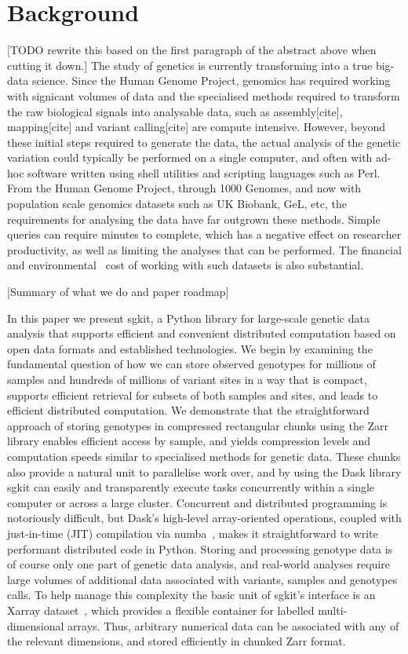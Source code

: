 \documentclass[a4paper,num-refs]{oup-contemporary}
\begin{document}
\section{Background}
[TODO rewrite this based on the first paragraph of the abstract above 
when cutting it down.]
The study of genetics is currently transforming into a true big-data science.
Since the Human Genome Project, genomics has required working with
signicant volumes of data and the specialised methods
required to transform the raw biological signals into analysable data,
such as assembly[cite], mapping[cite] and variant calling[cite] are compute intensive.
However, beyond these initial steps required to generate the data, the actual
analysis of the genetic variation could typically be performed on a single
computer, and often with ad-hoc software written using shell utilities
and scripting languages such as Perl.
From the Human Genome Project, through 1000 Genomes, and now with
population scale genomics datasets such as UK Biobank, GeL, etc,
the requirements for analysing the data have far outgrown these
methods. Simple queries can require minutes to complete, which
has a negative effect on researcher productivity, as well as limiting
the analyses that can be performed. The financial and 
environmental~\citep{grealey2022carbon,lannelongue2023greener} cost of working
with such datasets is also substantial.

[Summary of what we do and paper roadmap]

In this paper we present sgkit, a Python library for large-scale genetic data
analysis that supports efficient and convenient distributed computation based
on open data formats and established technologies. We begin by examining the
fundamental question of how we can store observed genotypes for millions of
samples and hundreds of millions of variant sites in a way that is compact,
supports efficient retrieval for subsets of both samples and sites, and leads
to efficient distributed computation. We demonstrate that the straightforward
approach of storing genotypes in compressed rectangular chunks using the Zarr
library enables efficient access by sample, and yields compression levels and
computation speeds similar to specialised methods for genetic data. These
chunks also provide
a natural unit %
to parallelise work over, and by using the Dask library sgkit can easily and
transparently execute tasks concurrently within a single computer or across a
large cluster. Concurrent and distributed programming is notoriously difficult,
but Dask's high-level array-oriented operations, coupled with just-in-time
(JIT) compilation via numba~\citep{lam2015numba}, makes it straightforward to
write performant distributed code in Python.
Storing and processing genotype data is of course only one part of
genetic data analysis, and real-world analyses require large volumes
of additional data associated with variants, samples and genotypes calls.
To help manage this complexity
the basic unit of sgkit's interface is an Xarray
dataset~\citep{hoyer2017xarray}, which provides a flexible container
for labelled multi-dimensional arrays. Thus, arbitrary numerical data
can be associated with any of the relevant dimensions, and stored
efficiently in chunked Zarr format.
\end{document}
